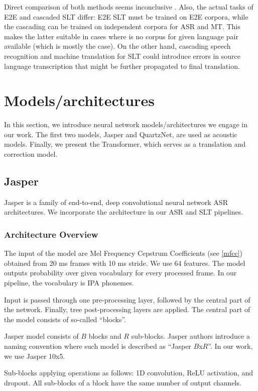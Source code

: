 Direct comparison of both methods seems inconclusive . Also, the actual tasks of E2E and cascaded SLT differ: E2E SLT must be trained on E2E corpora, while the cascading can be trained on independent corpora for ASR and MT. This makes the latter suitable in cases where is no corpus for given language pair available (which is mostly the case). On the other hand, cascading speech recognition and machine translation for SLT could introduce errors in source language transcription that might be further propagated to final translation.

\section{Models/architectures}
In this section, we introduce neural network models/architectures we engage in our work. The first two models, Jasper and QuartzNet, are used as acoustic models. Finally, we present the Transformer, which serves as a translation and correction model.

\subsection{Jasper}

Jasper  is a family of end-to-end, deep convolutional neural network ASR architectures. We incorporate the architecture in our ASR and SLT pipelines.

\subsubsection{Architecture Overview}
The input of the model are Mel Frequency Cepstrum Coefficients (see \cref{mfcc}) obtained from 20 ms frames with 10 ms stride. We use 64 features. The model outputs probability over given vocabulary for every processed frame. In our pipeline, the vocabulary is IPA phonemes.

Input is passed through one pre-processing layer, followed by the central part of the network. Finally, tree post-processing layers are applied. The central part of the model consists of so-called ``blocks''.

Jasper model consists of $B$ blocks and $R$ sub-blocks. Jasper authors introduce a naming convention where such model is described as ``Jasper $B$x$R$''. In our work, we use Jasper 10x5.

Sub-blocks applying operations as follows: 1D convolution, ReLU activation, and dropout. All sub-blocks of a block have the same number of output channels. 

